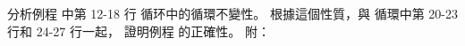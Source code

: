 \startEXERCISE
分析例程  中第 12-18 行  循环中的循環不變性。
根據這個性質，與  循環中第 20-23 行和 24-27 行一起，
證明例程  的正確性。
附：

\stopEXERCISE

\startANSWER
{}
\stopANSWER
